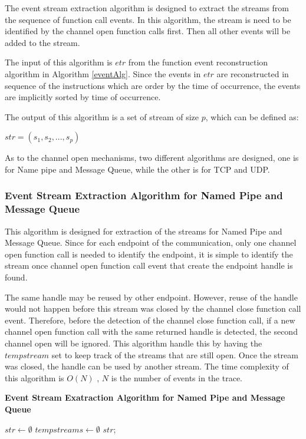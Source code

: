The event stream extraction algorithm is designed to extract the streams from the sequence of function call events. In this algorithm, the stream is need to be identified by the channel open function calls first. Then all other events will be added to the stream.

The input of this algorithm is $etr$ from the function event reconstruction algorithm in Algorithm \ref{eventAlg}. Since the events in $etr$ are reconstructed in sequence of the instructions which are order by the time of occurrence, the events are implicitly sorted by time of occurrence. 

The output of this algorithm is a set of stream of size $p$, which can be defined as:

$str = (s_1, s_2, ..., s_p)$

As to the channel open mechanisms, two different algorithms are designed, one is for Name pipe and Message Queue, while the other is for TCP and UDP. 

\subsubsection{Event Stream Extraction Algorithm for Named Pipe and Message Queue}
This algorithm is designed for extraction of the streams for Named Pipe and Message Queue. Since for each endpoint of the communication, only one channel open function call is needed to identify the endpoint, it is simple to identify the stream once channel open function call event that create the endpoint handle is found. 

The same handle may be reused by other endpoint. However, reuse of the handle would not happen before this stream was closed by the channel close function call event. Therefore, before the detection of the channel close function call, if a new channel open function call with the same returned handle is detected, the second channel open will be ignored. This algorithm handle this by having the $tempstream$ set to keep track of the streams that are still open. Once the stream was closed, the handle can be used by another stream. The time complexity of this algorithm is $O(N)$ , $N$ is the number of events in the trace.

\begin{algorithm}[H]
\DontPrintSemicolon
\caption{{\bf Event Stream Exatraction Algorithm for Named Pipe and Message Queue} \label{streamext1}}
$str \leftarrow \emptyset$\; 
$tempstreams \leftarrow \emptyset$   
\KwRet $str$;\;
\end{algorithm} 

